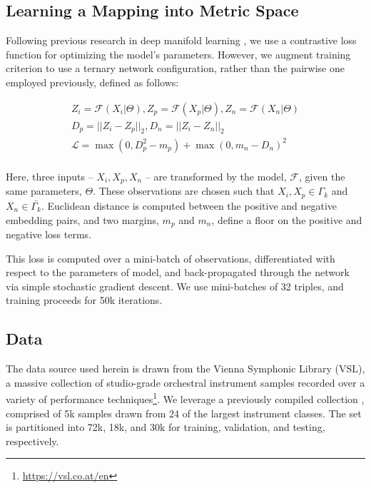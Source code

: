 \documentclass{article}
\begin{document}
\subsection{Learning a Mapping into Metric Space}

Following previous research in deep manifold learning \cite{hadsell2006drlim, humphrey2011nlse, humphrey2015dl4mir}, we use a contrastive loss function for optimizing the model's parameters.
However, we augment training criterion to use a ternary network configuration, rather than the pairwise one employed previously, defined as follows:

\begin{align*}
Z_i = \mathcal{F}(X_i | \Theta), Z_p = \mathcal{F}(X_p | \Theta), Z_n = \mathcal{F}(X_n | \Theta)\\
D_p = || Z_i - Z_p ||_2, D_n = || Z_i - Z_n ||_2\\
\mathcal{L} = \max(0, D_p^2 - m_{p}) + \max(0, m_{n} - D_n)^2 \\
\end{align*}

Here, three inputs -- $X_i, X_p, X_n$ -- are transformed by the model, $\mathcal{F}$, given the same parameters, $\Theta$.
These observations are chosen such that $X_i, X_p \in \Gamma_k$ and $X_n \in \bar{\Gamma_k}$.
Euclidean distance is computed between the positive and negative embedding pairs, and two margins, $m_p$ and $m_n$, define a floor on the positive and negative loss terms.

This loss is computed over a mini-batch of observations, differentiated with respect to the parameters of model, and back-propagated through the network via simple stochastic gradient descent.
We use mini-batches of 32 triples, and training proceeds for 50k iterations.

\subsection{Data}

The data source used herein is drawn from the Vienna Symphonic Library (VSL), a massive collection of studio-grade orchestral instrument samples recorded over a variety of performance techniques\footnote{\url{https://vsl.co.at/en}}.
We leverage a previously compiled collection \cite{humphrey2015dl4mir}, comprised of 5k samples drawn from 24 of the largest instrument classes.
The set is partitioned into 72k, 18k, and 30k for training, validation, and testing, respectively.
\end{document}
